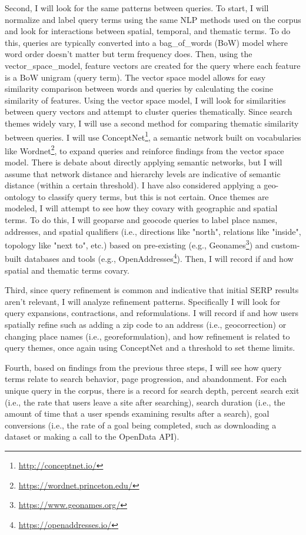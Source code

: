 Second, I will look for the same patterns between queries. To start, I will normalize and label query terms using the same NLP methods used on the corpus and look for interactions between spatial, temporal, and thematic terms. To do this, queries are typically converted into a \gls{bag_of_words} (\acrshort{BoW}) model where word order doesn't matter but term frequency does. Then, using the \gls{vector_space_model}, feature vectors are created for the query where each feature is a BoW unigram (query term). The vector space model allows for easy similarity comparison between words and queries by calculating the cosine similarity of features. Using the vector space model, I will look for similarities between query vectors and attempt to cluster queries thematically. Since search themes widely vary, I will use a second method for comparing thematic similarity between queries. I will use ConceptNet\footnote{\url{http://conceptnet.io/}}, a semantic network built on vocabularies like Wordnet\footnote{\url{https://wordnet.princeton.edu/}}, to expand queries and reinforce findings from the vector space model. There is debate about directly applying semantic networks, but I will assume that network distance and hierarchy levels are indicative of semantic distance (within a certain threshold). I have also considered applying a geo-ontology to classify query terms, but this is not certain. Once themes are modeled, I will attempt to see how they covary with geographic and spatial terms. To do this, I will geoparse and geocode queries to label place names, addresses, and spatial qualifiers (i.e., directions like "north", relations like "inside", topology like "next to", etc.) based on pre-existing (e.g., Geonames\footnote{\url{https://www.geonames.org/}}) and custom-built databases and tools (e.g., OpenAddresses\footnote{\url{https://openaddresses.io/}}). Then, I will record if and how spatial and thematic terms covary.

Third, since query refinement is common and indicative that initial SERP results aren't relevant, I will analyze refinement patterns. Specifically I will look for query expansions, contractions, and reformulations. I will record if and how users spatially refine such as adding a zip code to an address (i.e., geocorrection) or changing place names (i.e., georeformulation), and how refinement is related to query themes, once again using ConceptNet and a threshold to set theme limits.

Fourth, based on findings from the previous three steps, I will see how query terms relate to search behavior, page progression, and abandonment. For each unique query in the corpus, there is a record for search depth, percent search exit (i.e., the rate that users leave a site after searching), search duration (i.e., the amount of time that a user spends examining results after a search), goal conversions (i.e., the rate of a goal being completed, such as downloading a dataset or making a call to the OpenData API). 

